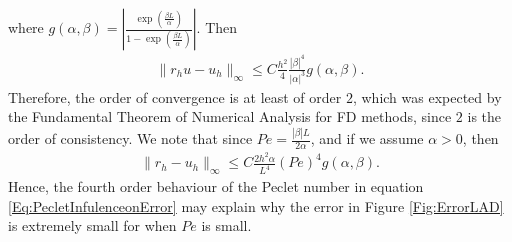 \documentclass[a4paper,11pt]{article}
\theoremstyle{break}
\theoremstyle{break2}
\theoremstyle{break}
\theoremstyle{break2}
\begin{document}
where $ g(\alpha,\beta) = \left|\frac{\exp\left(\frac{\beta L}{\alpha}\right)}{1 - \exp\left(\frac{\beta L}{\alpha}\right)}\right| $. Then
\begin{align*}
\|r_hu - u_h\|_{\infty} \leq C\frac{h^2}{4}\frac{|\beta|^4}{|\alpha|^3}g(\alpha,\beta).
\end{align*}
Therefore, the order of convergence is at least of order $ 2 $, which was expected by the Fundamental Theorem of Numerical Analysis for FD methods, since $ 2 $ is the order of consistency. We note that since $ Pe = \frac{|\beta|L}{2\alpha} $, and if we assume $ \alpha > 0 $, then
\begin{align}\label{Eq:PecletInfulenceonError}
\|r_h - u_h\|_{\infty} \leq C\frac{2h^2\alpha}{L^4}(Pe)^4g(\alpha,\beta).
\end{align}
Hence, the fourth order behaviour of the Peclet number in equation \eqref{Eq:PecletInfulenceonError} may explain why the error in Figure \ref{Fig:ErrorLAD} is extremely small for when $ Pe $ is small.
\end{document}
